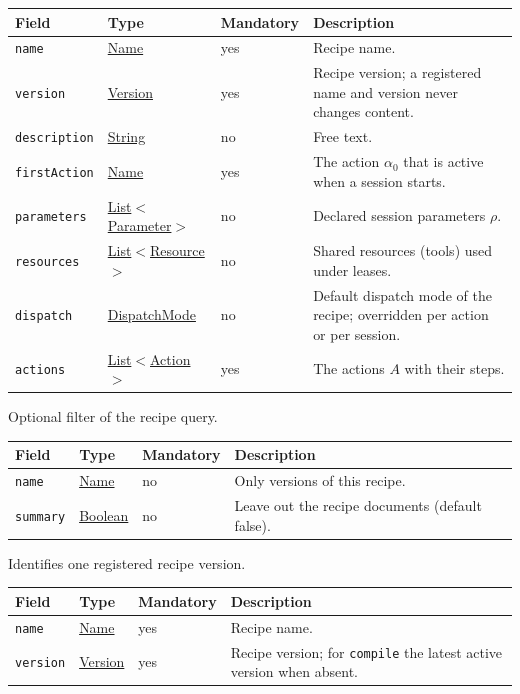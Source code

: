 \documentclass[a4paper]{arrowhead}
\newcommand{\mref}[1]{{\textcolor{ArrowheadPurple}{\hyperref[sec:model:#1]{#1}}}}
\newcommand{\pref}[1]{{\textcolor{ArrowheadGrey}{\hyperref[sec:model:primitives:#1]{#1}}}}
\begin{document}
{\small
\begin{longtable}{|p{3.7cm}|p{4.2cm}|p{1.6cm}|p{6.3cm}|}

\hline
\rowcolor{gray!33} Field & Type & Mandatory & Description \\ \hline
\endhead
\texttt{name} & \pref{Name} & yes & Recipe name. \\ \hline
\texttt{version} & \pref{Version} & yes & Recipe version; a registered name and version never changes content. \\ \hline
\texttt{description} & \pref{String} & no & Free text. \\ \hline
\texttt{firstAction} & \pref{Name} & yes & The action $\alpha_0$ that is active when a session starts. \\ \hline
\texttt{parameters} & \pref{List}$<$\mref{Parameter}$>$ & no & Declared session parameters $\rho$. \\ \hline
\texttt{resources} & \pref{List}$<$\mref{Resource}$>$ & no & Shared resources (tools) used under leases. \\ \hline
\texttt{dispatch} & \mref{DispatchMode} & no & Default dispatch mode of the recipe; overridden per action or per session. \\ \hline
\texttt{actions} & \pref{List}$<$\mref{Action}$>$ & yes & The actions $A$ with their steps. \\ \hline
\end{longtable}
}

Optional filter of the recipe query.

{\small
\begin{longtable}{|p{3.7cm}|p{4.2cm}|p{1.6cm}|p{6.3cm}|}

\hline
\rowcolor{gray!33} Field & Type & Mandatory & Description \\ \hline
\endhead
\texttt{name} & \pref{Name} & no & Only versions of this recipe. \\ \hline
\texttt{summary} & \pref{Boolean} & no & Leave out the recipe documents (default false). \\ \hline
\end{longtable}
}

Identifies one registered recipe version.

{\small
\begin{longtable}{|p{3.7cm}|p{4.2cm}|p{1.6cm}|p{6.3cm}|}

\hline
\rowcolor{gray!33} Field & Type & Mandatory & Description \\ \hline
\endhead
\texttt{name} & \pref{Name} & yes & Recipe name. \\ \hline
\texttt{version} & \pref{Version} & yes & Recipe version; for \texttt{compile} the latest active version when absent. \\ \hline
\end{longtable}
}
\end{document}
